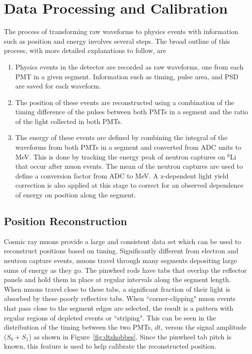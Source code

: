 \section{Data Processing and Calibration}

The process of transforming raw waveforms to physics events with information such as position and energy involves several steps. 
The broad outline of this process, with more detailed explanations to follow, are
\begin{enumerate}
	\item Physics events in the detector are recorded as raw waveforms, one from each PMT in a given segment. Information such as timing, pulse area, and PSD are saved for each waveform.
	\item The position of these events are reconstructed using a combination of the timing difference of the pulses between both PMTs in a segment and the ratio of the light collected in both PMTs.
	\item The energy of these events are defined by combining the integral of the waveforms from both PMTs in a segment and converted from ADC units to MeV. This is done by tracking the energy peak of neutron captures on $^6$Li that occur after muon events. The mean of the neutron captures are used to define a conversion factor from ADC to MeV. 
	A z-dependent light yield correction is also applied at this stage to correct for an observed dependence of energy on position along the segment.
\end{enumerate}


\subsection{Position Reconstruction}

Cosmic ray muons provide a large and consistent data set which can be used to reconstruct positions based on timing.
Significantly different from electron and neutron capture events, muons travel through many segments depositing large sums of energy as they go.
The pinwheel rods have tabs that overlap the reflector panels and hold them in place at regular intervals along the segment length.
When muons travel close to these tabs, a significant fraction of their light is absorbed by these poorly reflective tabs. 
When ``corner-clipping" muon events that pass close to the segment edges are selected, the result is a pattern with regular regions of depleted events or ``striping". 
This can be seen in the distribution of the timing between the two PMTs, $dt$, versus the signal amplitude ($S_0 + S_1$) as shown in Figure~\ref{fig:dtshobbes}.
Since the pinwheel tab pitch is known, this feature is used to help calibrate the reconstructed position.

